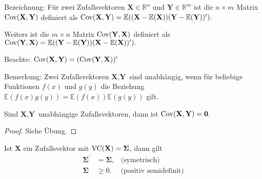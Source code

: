 \documentclass{tstextbook}
\begin{document}
\begin{remark}
	Bezeichnung:
Für zwei Zufallsvektoren $ \textbf{X}\in\mathbb{R}^n $ und $ \textbf{Y}\in\mathbb{R}^m $ ist die $ n\times m $ Matrix $ \operatorname{Cov}(\textbf{X},\textbf{Y}) $ definiert als $ \operatorname{Cov}(\textbf{X},\textbf{Y})=\mathbb{E}((\textbf{X}-\mathbb{E}(\textbf{X}))(\textbf{Y}-\mathbb{E}(\textbf{Y}))^\prime). $

Weiters ist die $ m\times n $ Matrix $ \operatorname{Cov}(\textbf{Y},\textbf{X}) $ definiert als $ \operatorname{Cov}(\textbf{Y},\textbf{X})=\mathbb{E}((\textbf{Y}-\mathbb{E}(\textbf{Y}))(\textbf{X}-\mathbb{E}(\textbf{X}))^\prime). $

Beachte: $ \operatorname{Cov}(\textbf{X},\textbf{Y}) = (\operatorname{Cov}(\textbf{Y},\textbf{X}))^\prime $
\end{remark}

\begin{remark}
	Bemerkung: Zwei Zufallsvektoren $ \textbf{X}, \textbf{Y} $ sind unabhängig, wenn für beliebige Funktionen $ f(x) $ und $ g(y) $ die Beziehung $ \mathbb{E}(f(x)g(y))=\mathbb{E}(f(x))\mathbb{E}(g(y)) $ gilt.
\end{remark}

\begin{theorem}
	Sind $ \textbf{X}, \textbf{Y} $ unabhängige Zufallsvektoren, dann ist $ \operatorname{Cov}(\textbf{X},\textbf{Y})=\boldsymbol{0}. $
\end{theorem}

\begin{proof}
	Siehe Übung.
\end{proof}

\begin{theorem}
	
	Ist $ \textbf{X} $ ein Zufallsvektor mit $ \operatorname{VC}(\textbf{X})=\boldsymbol{\Sigma} $, dann gilt 
	\[\begin{aligned}
	\boldsymbol{\Sigma}^\prime &=\boldsymbol{\Sigma}, & \text{(symetrisch)} \\
	\boldsymbol{\Sigma} & \ge0. & \text{(positiv semidefinit)}
	\end{aligned}
	\] 
	
\end{theorem}
\end{document}
